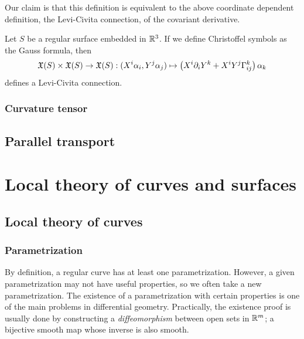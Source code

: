 \documentclass{../note}
\def\a{\alpha}
\begin{document}
Our claim is that this definition is equivalent to the above coordinate dependent definition, the Levi-Civita connection, of the covariant derivative.

\begin{prop}
Let $S$ be a regular surface embedded in $\mathbb{R}^3$.
If we define Christoffel symbols as the Gauss formula, then
\[\fX(S)\times\fX(S)\to\fX(S):(X^i\a_i,Y^j\a_j)\mapsto\left(X^i\pd_iY^k+X^iY^j\Gamma_{ij}^k\right)\a_k\]
defines a Levi-Civita connection.
\end{prop}

\section{Curvature tensor}



\chapter{Parallel transport}




















\part{Local theory of curves and surfaces}

\chapter{Local theory of curves}

\section{Parametrization}

By definition, a regular curve has at least one parametrization.
However, a given parametrization may not have useful properties, so we often take a new parametrization.
The existence of a parametrization with certain properties is one of the main problems in differential geometry.
Practically, the existence proof is usually done by constructing a \emph{diffeomorphism} between open sets in $\mathbb{R}^m$; a bijective smooth map whose inverse is also smooth.
\end{document}
